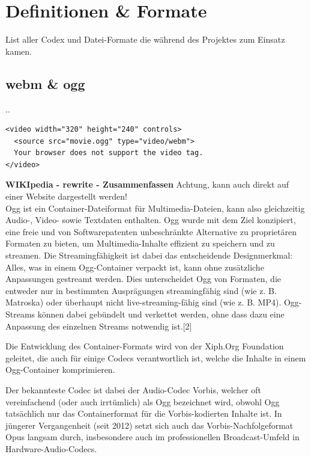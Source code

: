 \section{Definitionen \& Formate}
List aller Codex und Datei-Formate die während des Projektes zum Einsatz kamen.

\subsection{webm \& ogg}
..

\begin{verbatim}
<video width="320" height="240" controls>
  <source src="movie.ogg" type="video/webm">
  Your browser does not support the video tag.
</video> 
\end{verbatim}

\textbf{WIKIpedia - rewrite - Zusammenfassen}
Achtung, kann auch direkt auf einer Website dargestellt werden!\\

Ogg ist ein Container-Dateiformat für Multimedia-Dateien, kann also gleichzeitig Audio-, Video- sowie Textdaten enthalten. Ogg wurde mit dem Ziel konzipiert, eine freie und von Softwarepatenten unbeschränkte Alternative zu proprietären Formaten zu bieten, um Multimedia-Inhalte effizient zu speichern und zu streamen. Die Streamingfähigkeit ist dabei das entscheidende Designmerkmal: Alles, was in einem Ogg-Container verpackt ist, kann ohne zusätzliche Anpassungen gestreamt werden. Dies unterscheidet Ogg von Formaten, die entweder nur in bestimmten Ausprägungen streamingfähig sind (wie z. B. Matroska) oder überhaupt nicht live-streaming-fähig sind (wie z. B. MP4). Ogg-Streams können dabei gebündelt und verkettet werden, ohne dass dazu eine Anpassung des einzelnen Streams notwendig ist.[2]

Die Entwicklung des Container-Formats wird von der Xiph.Org Foundation geleitet, die auch für einige Codecs verantwortlich ist, welche die Inhalte in einem Ogg-Container komprimieren.

Der bekannteste Codec ist dabei der Audio-Codec Vorbis, welcher oft vereinfachend (oder auch irrtümlich) als Ogg bezeichnet wird, obwohl Ogg tatsächlich nur das Containerformat für die Vorbis-kodierten Inhalte ist. In jüngerer Vergangenheit (seit 2012) setzt sich auch das Vorbis-Nachfolgeformat Opus langsam durch, insbesondere auch im professionellen Broadcast-Umfeld in Hardware-Audio-Codecs. 

